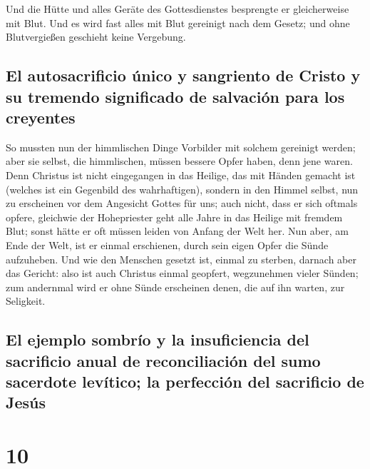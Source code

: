  Und die Hütte und alles Geräte des Gottesdienstes
besprengte er gleicherweise mit Blut.  Und es wird fast
alles mit Blut gereinigt nach dem Gesetz; und ohne Blutvergießen
geschieht keine Vergebung.

\hypertarget{el-autosacrificio-uxfanico-y-sangriento-de-cristo-y-su-tremendo-significado-de-salvaciuxf3n-para-los-creyentes}{%
\subsection{El autosacrificio único y sangriento de Cristo y su tremendo
significado de salvación para los
creyentes}\label{el-autosacrificio-uxfanico-y-sangriento-de-cristo-y-su-tremendo-significado-de-salvaciuxf3n-para-los-creyentes}}

 So mussten nun der himmlischen Dinge Vorbilder mit
solchem gereinigt werden; aber sie selbst, die himmlischen, müssen
bessere Opfer haben, denn jene waren.  Denn Christus ist
nicht eingegangen in das Heilige, das mit Händen gemacht ist (welches
ist ein Gegenbild des wahrhaftigen), sondern in den Himmel selbst, nun
zu erscheinen vor dem Angesicht Gottes für uns;  auch
nicht, dass er sich oftmals opfere, gleichwie der Hohepriester geht alle
Jahre in das Heilige mit fremdem Blut;  sonst hätte er
oft müssen leiden von Anfang der Welt her. Nun aber, am Ende der Welt,
ist er einmal erschienen, durch sein eigen Opfer die Sünde aufzuheben.
 Und wie den Menschen gesetzt ist, einmal zu sterben,
darnach aber das Gericht:  also ist auch Christus einmal
geopfert, wegzunehmen vieler Sünden; zum andernmal wird er ohne Sünde
erscheinen denen, die auf ihn warten, zur Seligkeit.

\hypertarget{el-ejemplo-sombruxedo-y-la-insuficiencia-del-sacrificio-anual-de-reconciliaciuxf3n-del-sumo-sacerdote-levuxedtico-la-perfecciuxf3n-del-sacrificio-de-jesuxfas}{%
\subsection{El ejemplo sombrío y la insuficiencia del sacrificio anual
de reconciliación del sumo sacerdote levítico; la perfección del
sacrificio de
Jesús}\label{el-ejemplo-sombruxedo-y-la-insuficiencia-del-sacrificio-anual-de-reconciliaciuxf3n-del-sumo-sacerdote-levuxedtico-la-perfecciuxf3n-del-sacrificio-de-jesuxfas}}

\hypertarget{section-9}{%
\section{10}\label{section-9}}

